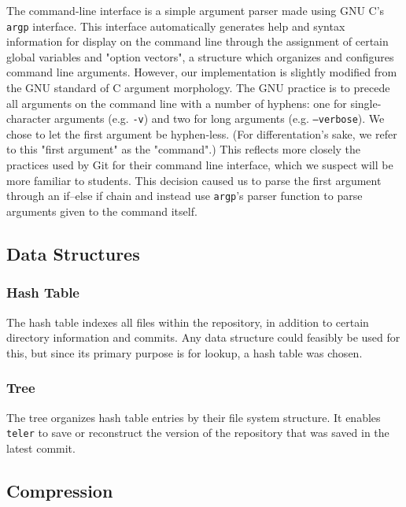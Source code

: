 \documentclass[12pt, letterpaper]{article}
\begin{document}
The command-line interface is a simple argument parser made using GNU C's
\texttt{argp} interface. This interface automatically generates help and syntax
information for display on the command line through the assignment of certain
global variables and "option vectors", a structure which organizes and
configures command line arguments. However, our implementation is slightly
modified from the GNU standard of C argument morphology. The GNU practice is to
precede all arguments on the command line with a number of hyphens: one for
single-character arguments (e.g. \texttt{-v}) and two for long arguments (e.g.
\texttt{--verbose}). We chose to let the first argument be hyphen-less. (For
differentation's sake, we refer to this "first argument" as the "command".) This
reflects more closely the practices used by Git for their command line
interface, which we suspect will be more familiar to students. This decision
caused us to parse the first argument through an if--else if chain and instead
use \texttt{argp}'s parser function to parse arguments given to the command
itself.

\subsection{Data Structures}
\label{subsec:datastructures}

\subsubsection{Hash Table}
\label{subsubsec:datastructures}

The hash table indexes all files within the repository, in addition to certain
directory information and commits. Any data structure could feasibly be used for
this, but since its primary purpose is for lookup, a hash table was chosen.

\subsubsection{Tree}
\label{subsubsec:tree}

The tree organizes hash table entries by their file system structure. It enables
\texttt{teler} to save or reconstruct the version of the repository that was
saved in the latest commit.

\subsection{Compression}
\label{subsec:compression}
\end{document}
